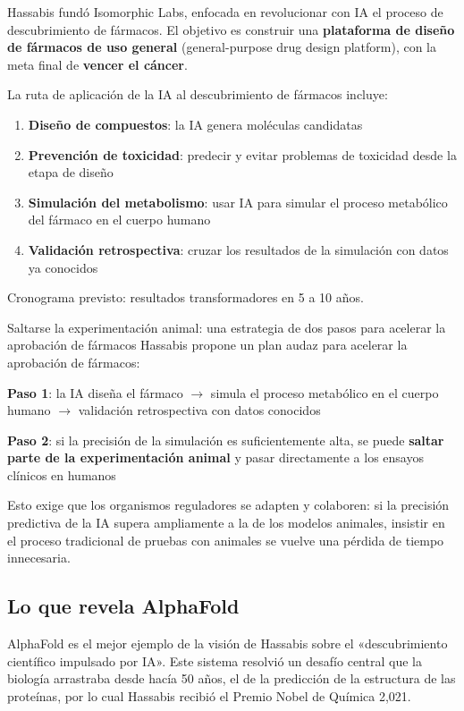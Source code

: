 \documentclass[a4paper]{article}
\begin{document}
Hassabis fundó Isomorphic Labs, enfocada en revolucionar con IA el proceso de descubrimiento de fármacos. El objetivo es construir una \textbf{plataforma de diseño de fármacos de uso general} (general-purpose drug design platform), con la meta final de \textbf{vencer el cáncer}.

La ruta de aplicación de la IA al descubrimiento de fármacos incluye:
\begin{enumerate}
    \item \textbf{Diseño de compuestos}: la IA genera moléculas candidatas
    \item \textbf{Prevención de toxicidad}: predecir y evitar problemas de toxicidad desde la etapa de diseño
    \item \textbf{Simulación del metabolismo}: usar IA para simular el proceso metabólico del fármaco en el cuerpo humano
    \item \textbf{Validación retrospectiva}: cruzar los resultados de la simulación con datos ya conocidos
\end{enumerate}

Cronograma previsto: resultados transformadores en 5 a 10 años.

\begin{importantbox}{Saltarse la experimentación animal: una estrategia de dos pasos para acelerar la aprobación de fármacos}
Hassabis propone un plan audaz para acelerar la aprobación de fármacos:

\textbf{Paso 1}: la IA diseña el fármaco $\to$ simula el proceso metabólico en el cuerpo humano $\to$ validación retrospectiva con datos conocidos

\textbf{Paso 2}: si la precisión de la simulación es suficientemente alta, se puede \textbf{saltar parte de la experimentación animal} y pasar directamente a los ensayos clínicos en humanos

Esto exige que los organismos reguladores se adapten y colaboren: si la precisión predictiva de la IA supera ampliamente a la de los modelos animales, insistir en el proceso tradicional de pruebas con animales se vuelve una pérdida de tiempo innecesaria.
\end{importantbox}

\subsection{Lo que revela AlphaFold}

AlphaFold es el mejor ejemplo de la visión de Hassabis sobre el «descubrimiento científico impulsado por IA». Este sistema resolvió un desafío central que la biología arrastraba desde hacía 50 años, el de la predicción de la estructura de las proteínas, por lo cual Hassabis recibió el Premio Nobel de Química 2,021.
\end{document}

